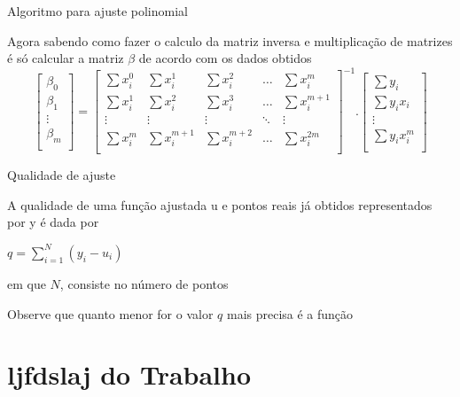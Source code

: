 \documentclass[10pt]{beamer}
\begin{document}
\begin{frame}{Algoritmo para ajuste polinomial}

  Agora sabendo como fazer o calculo da matriz inversa e multiplicação de matrizes é só calcular a matriz $\beta$ de acordo com os dados obtidos
  \[
    \begin{bmatrix}
      \beta_0 \\
      \beta_1 \\
      \vdots  \\
      \beta_m \\
    \end{bmatrix}
    =
    \begin{bmatrix}
      \sum{x_{i}^{0}} & \sum{x_{i}^{1}} & \sum{x_{i}^{2}} & \dots  & \sum{x_{i}^{m}} \\
      \sum{x_{i}^{1}} & \sum{x_{i}^{2}} & \sum{x_{i}^{3}} & \dots & \sum{x_{i}^{m+1}}\\
      \vdots & \vdots & \vdots & \ddots & \vdots \\
      \sum{x_{i}^{m}} & \sum{x_{i}^{m+1}} & \sum{x_{i}^{m+2}} & \dots  & \sum{x_{i}^{2m}} \\
    \end{bmatrix}^{-1}
    .
    \begin{bmatrix}
      \sum{y_{i}} \\
      \sum{y_{i}x_{i}}\\
      \vdots \\
      \sum{y_{i}x_{i}^{m}} \\
    \end{bmatrix}
  \]
\end{frame}

\begin{frame}{Qualidade de ajuste}

    A qualidade de uma função ajustada u e pontos reais já obtidos representados por y é dada por
    \begin{center}
        $q = \sum_{i=1}^{N} (y_{i}-u_{i})$
    \end{center}
    em que $N$, consiste no número de pontos
    
    Observe que quanto menor for o valor $q$ mais precisa é a função
\end{frame}

\section{ljfdslaj do Trabalho}
\end{document}
